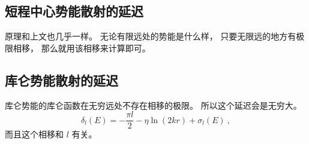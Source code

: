 \subsection{短程中心势能散射的延迟}

原理和上文也几乎一样。 无论有限远处的势能是什么样， 只要无限远的地方有极限相移， 那么就用该相移来计算即可。

\subsection{库仑势能散射的延迟}
库仑势能的库仑函数在无穷远处不存在相移的极限。 所以这个延迟会是无穷大。
\begin{equation}
\delta_l(E) =  - \frac{\pi l}{2} - \eta\ln(2kr) + \sigma_l(E)~,
\end{equation}
而且这个相移和 $l$ 有关。
